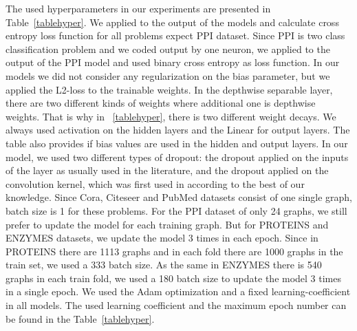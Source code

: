 \documentclass{article}
\begin{document}
The used hyperparameters in our experiments are presented in Table~\ref{tablehyper}. We applied  to the output of the models and calculate cross entropy loss function for all problems expect PPI dataset. Since PPI is two class classification problem and we coded output by one neuron, we applied  to the output of the PPI model and used binary cross entropy as loss function. In our models we did not consider any regularization on the bias parameter, but we applied the L2-loss to the trainable weights. In the depthwise separable layer, there are two different kinds of weights where additional one is depthwise weights. That is why in \tablename~\ref{tablehyper}, there is two different weight decays. We always used  activation on the hidden layers and the Linear for output layers. The table also provides if bias values are used in the hidden and output layers. In our model, we used two different types of dropout: the dropout applied on the inputs of the layer as usually used in the literature, and the dropout applied on the convolution kernel, which was first used in \cite{velivckovic2017graph} according to the best of our knowledge. Since Cora, Citeseer and PubMed datasets consist of one single graph, batch size is 1 for these problems. For the PPI dataset of only 24 graphs, we still prefer to update the model for each training graph. But for PROTEINS and ENZYMES datasets, we update the model 3 times in each epoch. Since in PROTEINS there are 1113 graphs and in each fold there are 1000 graphs in the train set, we used a 333 batch size. As the same in ENZYMES there is 540 graphs in each train fold, we used a 180 batch size to update the model 3 times in a single epoch. We used the Adam optimization and a fixed learning-coefficient in all models. The used learning coefficient and the maximum epoch number can be found in the Table~\ref{tablehyper}. 
\end{document}
